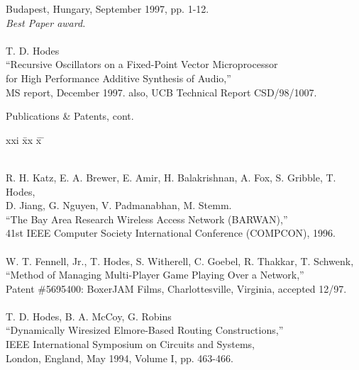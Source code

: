\begin{tabbing}
\>\>        Budapest, Hungary, September 1997, pp. 1-12. \\
\>\>        {\em Best Paper award. }\\
\smallskip \\[-3pt]
\>    T. D. Hodes \\
\>\>      ``Recursive Oscillators on a Fixed-Point Vector Microprocessor \\
\>\>\>     for High Performance Additive Synthesis of Audio,'' \\
\>\>       MS report, December 1997. also, UCB Technical Report CSD/98/1007. \\

\end{tabbing}
\newpage
\begin{bf} \large
Publications \& Patents, cont.
\end{bf}
\begin{tabbing}
xxi \= xx \= x \= \kill

\smallskip \\[-3pt]
\>    R. H. Katz, E. A. Brewer, E. Amir, H. Balakrishnan, A. Fox,
       S. Gribble, T. Hodes, \\
\>\>\>   D. Jiang, G. Nguyen, V. Padmanabhan, M. Stemm. \\
\>\> ``The Bay Area Research Wireless Access Network (BARWAN),''  \\
\>\> 41st IEEE Computer Society International Conference (COMPCON), 1996. \\
\smallskip \\
\>	W. T. Fennell, Jr., T. Hodes, S. Witherell, C. Goebel, 
	R. Thakkar, T. Schwenk, \\
\>\>	``Method of Managing Multi-Player Game Playing Over a Network,''  \\
\>\>	Patent \#5695400: BoxerJAM Films, Charlottesville, Virginia, accepted 12/97.  \\
\smallskip \\
\>    T. D. Hodes, B. A. McCoy, G. Robins \\
\>\>  ``Dynamically Wiresized Elmore-Based Routing Constructions,''  \\
\> IEEE International Symposium on Circuits and Systems, \\
\>\>   London, England, May 1994, Volume I, pp. 463-466. \\
\smallskip \\
\end{tabbing}


